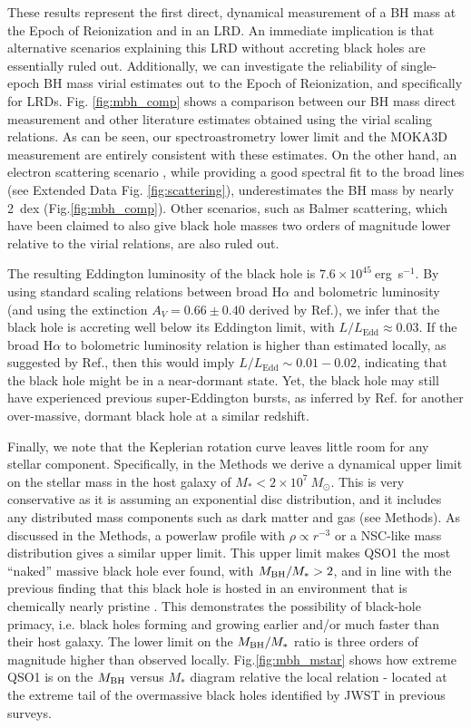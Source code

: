 \documentclass[twocolumn, fleqn]{doc_class}
\begin{document}
These results represent the first direct, dynamical measurement of a BH mass at the Epoch of Reionization and in an LRD. An immediate implication is that alternative scenarios explaining this LRD without accreting black holes are essentially ruled out. Additionally,
we can investigate the reliability of single-epoch BH mass virial estimates out to the Epoch of Reionization, and specifically for LRDs. Fig. \ref{fig:mbh_comp} shows a comparison between our BH mass direct measurement and other literature estimates obtained using the virial scaling relations. As can be seen, our spectroastrometry lower limit and the MOKA3D measurement are  entirely consistent with these estimates. On the other hand, an electron scattering scenario , while providing a good spectral fit to the broad lines (see Extended Data Fig. \ref{fig:scattering}), underestimates the BH mass by nearly 2~dex (Fig.\ref{fig:mbh_comp}). Other scenarios, such as Balmer scattering, which have been claimed to also give black hole masses two orders of magnitude lower relative to the virial relations, are also ruled out.

The resulting Eddington luminosity of the black hole is $7.6\times 10^{45}~$erg~s$^{-1}$. By using standard scaling relations between broad H$\alpha$ and bolometric luminosity (and using the extinction $A_V=0.66\pm0.40$ derived by Ref.), we infer that the black hole is accreting well below its Eddington limit, with $L/L_\mathrm{Edd}\approx 0.03$. If the broad H$\alpha$ to bolometric luminosity relation is higher than estimated locally, as suggested by Ref., then this would imply $L/L_\mathrm{Edd}\sim 0.01-0.02$, indicating that
the black hole might be in a near-dormant state. Yet, the black hole may still have experienced previous super-Eddington bursts, as inferred by Ref. for another over-massive, dormant black hole at a similar redshift.

Finally, we note that the Keplerian rotation curve leaves little room for any stellar component. Specifically, in the Methods we derive a dynamical upper limit  on the stellar mass in the host galaxy of $M_*<2\times 10^7~M_\odot$. This is very conservative as it is assuming an exponential disc distribution, and it includes any distributed mass components such as dark matter and gas (see Methods). As discussed in the Methods, a powerlaw profile with $\rho\propto r^{-3}$ or a NSC-like mass distribution gives a similar upper limit. This upper limit makes QSO1 the most ``naked'' massive black hole ever found, with $M_{\rm BH}/M_*>2$, and in line with the previous finding that this black hole is hosted in an environment that is chemically nearly pristine .
This demonstrates the possibility of black-hole primacy, i.e. black holes forming and growing earlier and/or much faster than their host galaxy.
The lower limit on the $M_{\rm BH}/M_*$ ratio is three orders of magnitude higher than observed locally. Fig.\ref{fig:mbh_mstar} shows how extreme  QSO1 is on the $M_{\rm BH}$ versus $M_*$ diagram relative the local relation - located at the extreme tail of the overmassive black holes identified by JWST in previous surveys.
\end{document}

